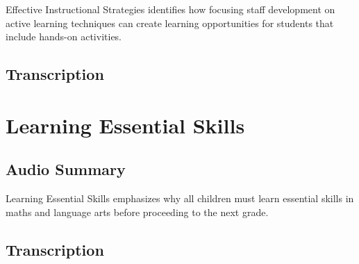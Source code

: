 Effective Instructional Strategies identifies how focusing staff development on active learning techniques can create learning opportunities for students that include hands-on activities.

\subsection{Transcription}

\section{Learning Essential Skills}

\subsection{Audio Summary}

Learning Essential Skills emphasizes why all children must learn essential skills in maths and language arts before proceeding to the next grade.

\subsection{Transcription}
